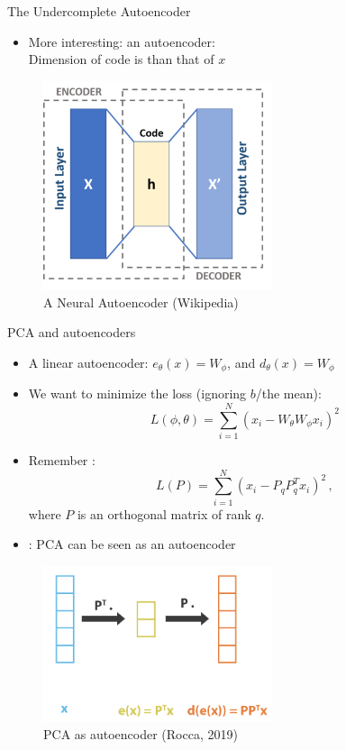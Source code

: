 \documentclass[10pt]{beamer}
\begin{document}
\begin{frame}{The Undercomplete Autoencoder}

\begin{itemize}
\item More interesting: an  autoencoder:\\Dimension of code is  than that of $x$
\end{itemize}

\begin{figure}[h]
\centering
\includegraphics[width=0.6\textwidth]{fig/440px-Autoencoder_schema.png}
\caption{A Neural Autoencoder (Wikipedia)}
\end{figure}

\end{frame}


\begin{frame}{PCA and autoencoders}

\begin{itemize}
\item A linear autoencoder: $e_\theta(x) = W_\phi$, and $d_\theta(x) = W_\phi$
\item We want to minimize the loss (ignoring $b$/the mean):
\[
L(\phi, \theta) = \sum_{i=1}^N (x_i - W_\theta W_\phi x_i)^2
\]
\pause
\item Remember :
\[
L(P) = \sum_{i=1}^N (x_i - P_q P_q^T x_i)^2\,,
\]
where $P$ is an orthogonal matrix of rank $q$.
\pause
\item {}: PCA can be seen as an autoencoder
\end{itemize}

\begin{figure}[h]
\centering
\includegraphics[width=0.6\textwidth]{fig/Rocca_PCA_as_autoencoder2.png}
\caption{PCA as autoencoder (Rocca, 2019)}
\end{figure}

\end{frame}
\end{document}
